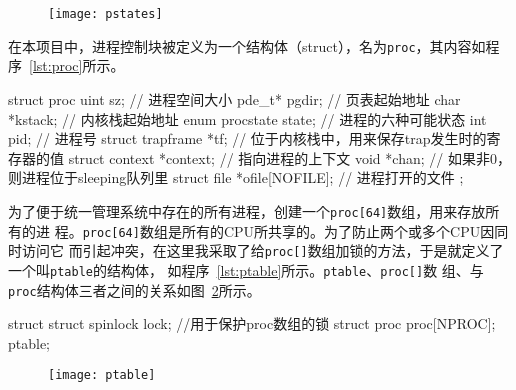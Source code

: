 \documentclass{swfcthesismscctex}
\begin{document}
\begin{figure}[!htb]
  \centering
  \vspace*{2ex}
  \begin{center}
    \texttt{[image: pstates]}
  \end{center}
  \label{fig:pstates}
\end{figure}

在本项目中，进程控制块被定义为一个结构体（struct），名为\texttt{proc}，其内容如程
序~\ref{lst:proc}所示。

\begin{listing}
  \begin{codeblock}
\begin{ccode}
struct proc {
  uint sz;                 // 进程空间大小
  pde_t* pgdir;            // 页表起始地址
  char *kstack;            // 内核栈起始地址
  enum procstate state;    // 进程的六种可能状态
  int pid;                 // 进程号
  struct trapframe *tf;    // 位于内核栈中，用来保存trap发生时的寄存器的值
  struct context *context; // 指向进程的上下文
  void *chan;              // 如果非0，则进程位于sleeping队列里
  struct file *ofile[NOFILE]; // 进程打开的文件
};
\end{ccode}
  \end{codeblock}
  \label{lst:proc}
\end{listing}

为了便于统一管理系统中存在的所有进程，创建一个\texttt{proc[64]}数组，用来存放所有的进
程。\texttt{proc[64]}数组是所有的CPU所共享的。为了防止两个或多个CPU因同时访问它
而引起冲突，在这里我采取了给\texttt{proc[]}数组加锁的方法，于是就定义了一个叫\texttt{ptable}的结构体，
如程序~\ref{lst:ptable}所示。\texttt{ptable}、\texttt{proc[]}数
组、与\texttt{proc}结构体三者之间的关系如图~\ref{fig:ptable}所示。

\begin{listing}%
  \begin{codeblock}
\begin{ccode}
struct {
  struct spinlock lock; //用于保护proc数组的锁
  struct proc proc[NPROC];
} ptable;
\end{ccode}
  \end{codeblock}
\label{lst:ptable}
\end{listing}

\begin{figure}[!htb]
  \centering
  \texttt{[image: ptable]}
  \label{fig:ptable}
\end{figure}
\end{document}
